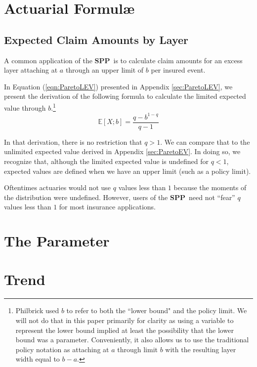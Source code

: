 \documentclass[]{article} %
\newcommand{\SPP}{\textbf{SPP}}
\begin{document}
\section{Actuarial Formul\ae}
\subsection{Expected Claim Amounts by Layer}
A common application of the \SPP~is to calculate claim amounts for an excess layer attaching at $a$ through an upper limit of $b$ per insured event.


In Equation (\ref{eqn:ParetoLEV}) presented in Appendix \ref{sec:ParetoLEV}, we present the derivation of the following formula to calculate the limited expected value through $b$.\footnote{Philbrick used $b$ to refer to both the ``lower bound" and the policy limit. We will not do that in this paper primarily for clarity as using a variable to represent the lower bound implied at least the possibility that the lower bound was a parameter. Conveniently, it also allows us  to use the traditional policy notation as attaching at $a$ through limit $b$ with the resulting layer width equal to $b - a$.} 
\begin{equation}
	\mathbb{E}[X;b] = \frac{q - b^{1-q}}{q-1}
\end{equation}

In that derivation, there is no restriction that $q > 1$. We can compare that to the unlimited expected value derived in Appendix \ref{sec:ParetoEV}. In doing so, we recognize that, although the limited expected value is undefined for $q < 1$, expected values are defined when we have an upper limit (such as a policy limit). 

Oftentimes actuaries would not use $q$ values less than $1$ because the moments of the distribution were undefined. However, users of the \SPP~need not ``fear'' $q$ values less than $1$ for most insurance applications.


\section{The Parameter}
\section{Trend}

\newpage
\appendix
\appendixpage
\end{document}
